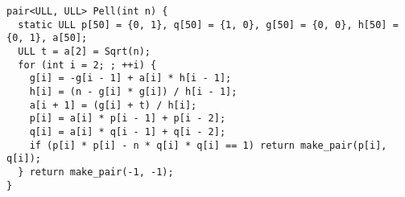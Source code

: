 \begin{lstlisting}
pair<ULL, ULL> Pell(int n) {
  static ULL p[50] = {0, 1}, q[50] = {1, 0}, g[50] = {0, 0}, h[50] = {0, 1}, a[50];
  ULL t = a[2] = Sqrt(n);
  for (int i = 2; ; ++i) {
    g[i] = -g[i - 1] + a[i] * h[i - 1];
    h[i] = (n - g[i] * g[i]) / h[i - 1];
    a[i + 1] = (g[i] + t) / h[i];
    p[i] = a[i] * p[i - 1] + p[i - 2];
    q[i] = a[i] * q[i - 1] + q[i - 2];
    if (p[i] * p[i] - n * q[i] * q[i] == 1) return make_pair(p[i], q[i]);
  } return make_pair(-1, -1);
}

\end{lstlisting}